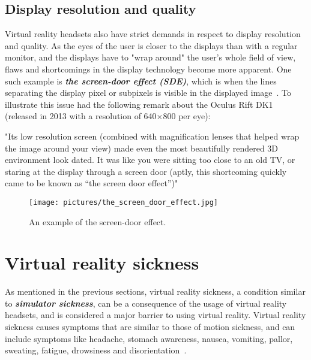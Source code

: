 \subsection{Display resolution and quality}
Virtual reality headsets also have strict demands in respect to display resolution and quality. As the eyes of the user is closer
to the displays than with a regular monitor, and the displays have to "wrap around" the user's whole field of view, flaws and shortcomings in the display technology 
become more apparent. 
One such example is \textbf{\textit{the screen-door effect (SDE)}}, 
which is when the lines separating the display pixel or subpixels is visible in the displayed image~\citep{TC2016}. 
To illustrate this issue \citet{TC2016} had the following remark about the Oculus Rift DK1 (released in 2013 with a resolution of 640×800 per eye):

"Its low resolution screen (combined with magnification lenses that helped wrap the image around your view) made even the most beautifully rendered 3D environment look dated. 
It was like you were sitting too close to an old TV, or staring at the display through a screen door (aptly, this shortcoming quickly came to be known as “the screen door effect”)"

\begin{figure}%
	\texttt{[image: pictures/the\_screen\_door\_effect.jpg]}
	\caption[The screen-door effect]{An example of the screen-door effect.}
	\label{fig:the_screen_door_effect}
\end{figure} 




\section{Virtual reality sickness}
As mentioned in the previous sections, virtual reality sickness, a condition similar to \textbf{\textit{simulator sickness}}, 
can be a consequence of the usage of virtual reality headsets, and is considered a major barrier to 
using virtual reality. Virtual reality sickness causes symptoms that are similar to those of motion sickness, and can include symptoms like 
headache, stomach awareness, nausea, vomiting, pallor, sweating, fatigue, drowsiness and disorientation~\citep{Kolasinski1995}. 

